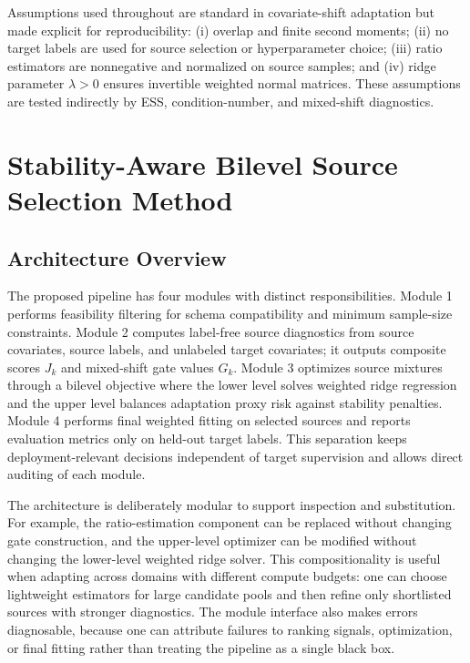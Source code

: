 \documentclass{article} %
\begin{document}
Assumptions used throughout are standard in covariate-shift adaptation but made explicit for reproducibility: (i) overlap and finite second moments; (ii) no target labels are used for source selection or hyperparameter choice; (iii) ratio estimators are nonnegative and normalized on source samples; and (iv) ridge parameter \(\lambda>0\) ensures invertible weighted normal matrices. These assumptions are tested indirectly by ESS, condition-number, and mixed-shift diagnostics.

\section{Stability-Aware Bilevel Source Selection Method}
\label{sec:method}
\subsection{Architecture Overview}
The proposed pipeline has four modules with distinct responsibilities. Module 1 performs feasibility filtering for schema compatibility and minimum sample-size constraints. Module 2 computes label-free source diagnostics from source covariates, source labels, and unlabeled target covariates; it outputs composite scores \(J_k\) and mixed-shift gate values \(G_k\). Module 3 optimizes source mixtures through a bilevel objective where the lower level solves weighted ridge regression and the upper level balances adaptation proxy risk against stability penalties. Module 4 performs final weighted fitting on selected sources and reports evaluation metrics only on held-out target labels. This separation keeps deployment-relevant decisions independent of target supervision and allows direct auditing of each module.

The architecture is deliberately modular to support inspection and substitution. For example, the ratio-estimation component can be replaced without changing gate construction, and the upper-level optimizer can be modified without changing the lower-level weighted ridge solver. This compositionality is useful when adapting across domains with different compute budgets: one can choose lightweight estimators for large candidate pools and then refine only shortlisted sources with stronger diagnostics. The module interface also makes errors diagnosable, because one can attribute failures to ranking signals, optimization, or final fitting rather than treating the pipeline as a single black box.
\end{document}
